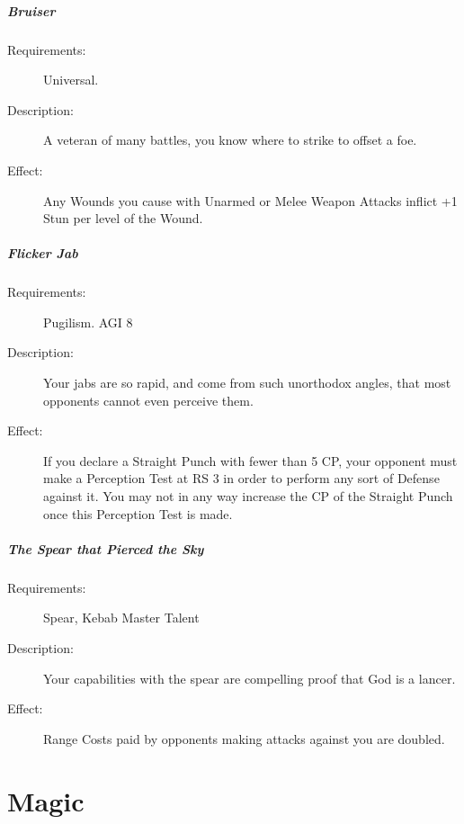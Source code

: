 \documentclass[oneside,11pt,english]{book}
\begin{document}
\paragraph{\label{talent:Bruiser}Bruiser}
\begin{description}
	\item [Requirements:] Universal. 
	\item [Description:] A veteran of many battles, you know where to strike to offset a foe. 
	\item [Effect:] Any Wounds you cause with Unarmed or Melee Weapon Attacks inflict +1 Stun per level of the Wound. 
	
\end{description}
\paragraph{\label{talent:Flicker Jab}Flicker Jab}
\begin{description}
	\item [Requirements:] Pugilism. AGI 8 
	\item [Description:] Your jabs are so rapid, and come from such unorthodox angles, that most opponents cannot even perceive them. 
	\item [Effect:] If you declare a Straight Punch with fewer than 5 CP, your opponent must make a Perception Test at RS 3 in order to perform any sort of Defense against it. You may not in any way increase the CP of the Straight Punch once this Perception Test is made.
\end{description}
\paragraph{\label{talent:The Spear that Pierced the Sky}The Spear that Pierced the Sky}
\begin{description}
	\item [Requirements:] Spear, Kebab Master Talent 
	\item [Description:] Your capabilities with the spear are compelling proof that God is a lancer. 
	\item [Effect:] Range Costs paid by opponents making attacks against you are doubled. 
\end{description}

\chapter{Magic}
\startcontents[chapters]
\clearpage
\end{document}
